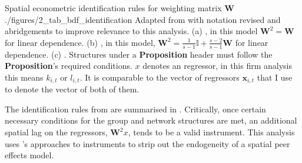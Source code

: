 \wraptable
    {Spatial econometric identification rules for weighting matrix $\mathbf W$}
    {./figures/2_tab_bdf_identification}
    {
        Adapted from  with notation
        revised and abridgements to improve relevance to this analysis.
        (a) , in this model $\mathbf W^2=\mathbf W$ for linear dependence.
        (b) , in this model, $\mathbf W^2 = \frac1{s-1}\mathbb I + \frac{s-2}{s-1}\mathbf W$ for linear dependence.
        (c) .
        Structures under a \textbf{Proposition} header must follow the \textbf{Proposition}'s required conditions.
        $x$ denotes an  regressor, in this firm analysis this means $k_{i,t}$ or $l_{i,t}$.
        It is comparable to the vector of regressors $\mathbf x_{i,t}$ that I use to denote
        the vector of both of them.
    }

The identification rules from \cite{Bramoulle2009} are summarised in .
Critically, once certain necessary conditions for the group and network structures are met,
an additional spatial lag on the  regressors, $\mathbf W^2x$,
tends to be a valid instrument.
This analysis uses 's approaches to instruments
to strip out the endogeneity of a spatial peer effects model.